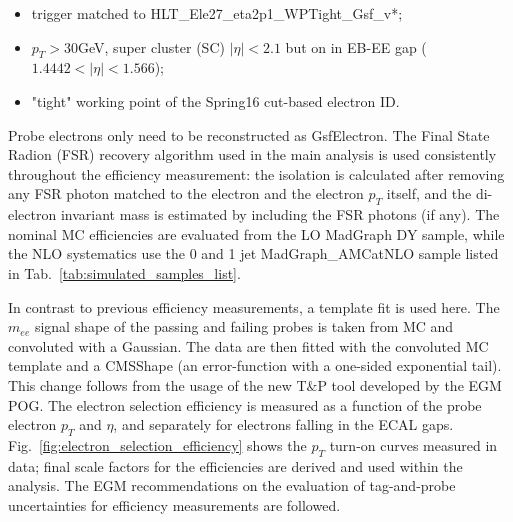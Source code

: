 \begin{itemize}
	\item trigger matched to HLT\_Ele27\_eta2p1\_WPTight\_Gsf\_v*;
	\item $p_{T} > 30$GeV, super cluster (SC) $|\eta| < 2.1$ but on in EB-EE gap ($1.4442 < |\eta| < 1.566$);
	\item "tight" working point of the Spring16 cut-based electron ID.
\end{itemize}

Probe electrons only need to be reconstructed as GsfElectron. The Final State Radion (FSR) recovery algorithm used in the main analysis is used consistently throughout the efficiency measurement: the isolation is calculated after removing any FSR photon matched to the electron and the electron $p_{T}$ itself, and the di-electron invariant mass is estimated by including the FSR photons (if any). The nominal MC efficiencies are evaluated from the LO MadGraph DY sample, while the NLO systematics use the 0 and 1 jet MadGraph\_AMCatNLO sample listed in Tab.~\ref{tab:simulated_samples_list}.

In contrast to previous efficiency measurements, a template fit is used here. The $m_{ee}$ signal shape of the passing and failing probes is taken from MC and convoluted with a Gaussian. The data are then fitted with the convoluted MC template and a CMSShape (an error-function with a one-sided exponential tail). This change follows from the usage of the new T$\&$P tool developed by the EGM POG. The electron selection efficiency is measured as a function of the probe electron $p_{T}$ and $\eta$, and separately for electrons falling in the ECAL gaps. Fig.~\ref{fig:electron_selection_efficiency} shows the $p_{T}$ turn-on curves measured in data; final scale factors for the efficiencies are derived and used within the analysis. The EGM recommendations on the evaluation of tag-and-probe uncertainties for efficiency measurements are followed.

